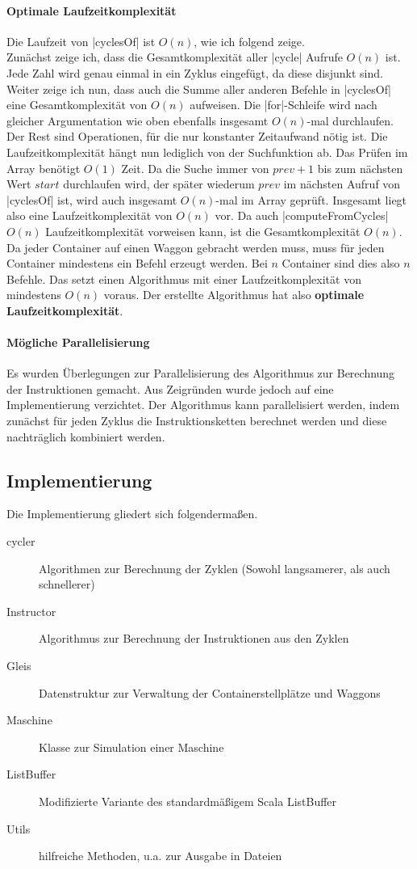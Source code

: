 \paragraph{Optimale Laufzeitkomplexität}
Die Laufzeit von |cyclesOf| ist $O(n)$, wie ich folgend zeige.\\
Zunächst zeige ich, dass die Gesamtkomplexität aller |cycle| Aufrufe $O(n)$ ist.
Jede Zahl wird genau einmal in ein Zyklus eingefügt, da diese disjunkt sind.
Weiter zeige ich nun, dass auch die Summe aller anderen Befehle in |cyclesOf| eine Gesamtkomplexität von $O(n)$ aufweisen.
Die |for|-Schleife wird nach gleicher Argumentation wie oben ebenfalls insgesamt $O(n)$-mal durchlaufen.
Der Rest sind Operationen, für die nur konstanter Zeitaufwand nötig ist. Die Laufzeitkomplexität hängt nun lediglich von der Suchfunktion ab.
Das Prüfen im Array benötigt $O(1)$ Zeit. Da die Suche immer von $prev+1$ bis zum nächsten Wert $start$ durchlaufen wird, der später wiederum $prev$ im nächsten Aufruf von |cyclesOf| ist,
wird auch insgesamt $O(n)$-mal im Array geprüft. Insgesamt liegt also eine Laufzeitkomplexität von $O(n)$ vor.
Da auch |computeFromCycles| $O(n)$ Laufzeitkomplexität vorweisen kann, ist die Gesamtkomplexität $O(n)$.\\
Da jeder Container auf einen Waggon gebracht werden muss, muss für jeden Container mindestens ein Befehl erzeugt werden.
Bei $n$ Container sind dies also $n$ Befehle. Das setzt einen Algorithmus mit einer Laufzeitkomplexität von mindestens $O(n)$ voraus.
Der erstellte Algorithmus hat also \textbf{optimale Laufzeitkomplexität}.

\paragraph{Mögliche Parallelisierung}
Es wurden Überlegungen zur Parallelisierung des Algorithmus zur Berechnung der Instruktionen gemacht.
Aus Zeigründen wurde jedoch auf eine Implementierung verzichtet.
Der Algorithmus kann parallelisiert werden,
indem zunächst für jeden Zyklus die Instruktionsketten berechnet werden und diese nachträglich kombiniert werden.

\subsection{Implementierung}
Die Implementierung gliedert sich folgendermaßen.
\begin{description}
 \item[cycler] Algorithmen zur Berechnung der Zyklen (Sowohl langsamerer, als auch schnellerer)
 \item[Instructor] Algorithmus zur Berechnung der Instruktionen aus den Zyklen
 \item[Gleis] Datenstruktur zur Verwaltung der Containerstellplätze und Waggons
 \item[Maschine] Klasse zur Simulation einer Maschine
 \item[ListBuffer] Modifizierte Variante des standardmäßigem Scala ListBuffer
 \item[Utils] hilfreiche Methoden, u.a. zur Ausgabe in Dateien
\end{description}

